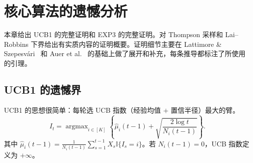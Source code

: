 \documentclass[UTF8,a4paper,11pt,zihao=5]{ctexart}
\newcommand{\ind}{\mathbb{I}}
\newcommand{\argmax}{\mathop{\arg\max}}
\begin{document}
\newpage
\section{核心算法的遗憾分析}

本章给出 UCB1 的完整证明和 EXP3 的完整证明。对 Thompson 采样和 Lai--Robbins 下界给出有实质内容的证明概要。证明细节主要在 Lattimore \& Szepesvári~\cite{lattimore2020} 和 Auer et al.~\cite{auer2002} 的基础上做了展开和补充，每条推导都标注了所使用的引理。

\subsection{UCB1 的遗憾界}

UCB1 的思想很简单：每轮选 UCB 指数（经验均值 $+$ 置信半径）最大的臂。
\begin{equation}\label{eq:ucb}
    I_t = \argmax_{i \in [K]} \left\{ \hat{\mu}_i(t-1) + \sqrt{\frac{2 \log t}{N_i(t-1)}} \right\}.
\end{equation}
其中 $\hat{\mu}_i(t-1) = \frac{1}{N_i(t-1)} \sum_{s=1}^{t-1} X_s \ind\{I_s=i\}$。若 $N_i(t-1)=0$，UCB 指数定义为 $+\infty$。
\end{document}

